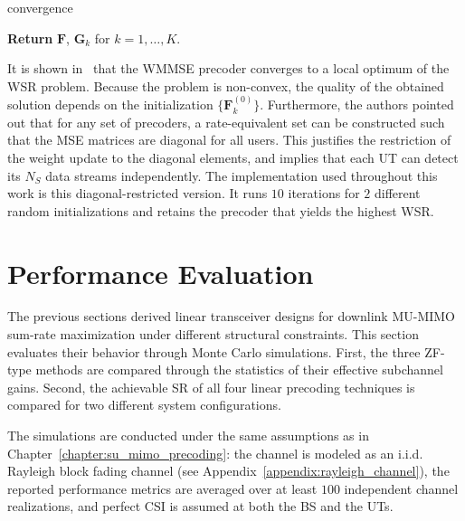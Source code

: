 \begin{algorithm}[!htbp]
\begin{algorithmic}[1]
    \vspace{0.2\baselineskip}
    \Until convergence

    \medskip
    \Statex \hspace{-\algorithmicindent}\textbf{Return} \; $\mathbf{F}$, \; $\mathbf{G}_k$ for $k = 1, \dots, K$.

\end{algorithmic}
\end{algorithm}

It is shown in~\cite{WMMSE_precoding} that the \ac{WMMSE} precoder converges to a local optimum of the \ac{WSR} problem.
Because the problem is non-convex, the quality of the obtained solution depends on the initialization $\{\mathbf{F}_k^{(0)}\}$.
Furthermore, the authors pointed out that for any set of precoders, a rate-equivalent set can be constructed such that the MSE matrices are diagonal for all users.
This justifies the restriction of the weight update to the diagonal elements, and implies that each \ac{UT} can detect its $N_S$ data streams independently.
The implementation used throughout this work is this diagonal-restricted version. It runs $10$ iterations for $2$ different random initializations and retains the precoder that yields the highest \ac{WSR}.


\section{Performance Evaluation}
\label{section:mu_mimo_performance_evaluation}

The previous sections derived linear transceiver designs for downlink \ac{MU}-\ac{MIMO} sum-rate maximization under different structural constraints.
This section evaluates their behavior through Monte Carlo simulations.
First, the three \ac{ZF}-type methods are compared through the statistics of their effective subchannel gains.
Second, the achievable \ac{SR} of all four linear precoding techniques is compared for two different system configurations.

The simulations are conducted under the same assumptions as in Chapter~\ref{chapter:su_mimo_precoding}: 
the channel is modeled as an \ac{i.i.d.} Rayleigh block fading channel (see Appendix~\ref{appendix:rayleigh_channel}), the reported performance metrics are averaged over at least $100$ independent channel realizations, and perfect \ac{CSI} is assumed at both the \ac{BS} and the \acp{UT}.

